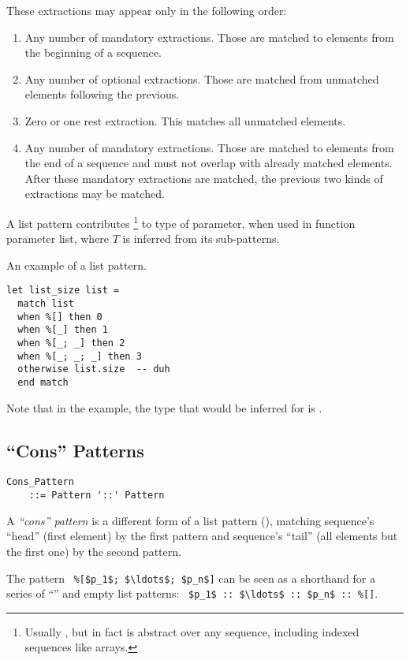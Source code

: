 These extractions may appear only in the following order:
\begin{enumerate}
  \item Any number of mandatory extractions. Those are matched to elements from the beginning of a sequence. 
  \item Any number of optional extractions. Those are matched from unmatched elements following the previous. 
  \item Zero or one rest extraction. This matches all unmatched elements. 
  \item Any number of mandatory extractions. Those are matched to elements from the end of a sequence and must not overlap with already matched elements. After these mandatory extractions are matched, the previous two kinds of extractions may be matched. 
\end{enumerate}

A list pattern contributes \footnote{Usually , but in fact is abstract over any sequence, including indexed sequences like arrays.} to type of parameter, when used in function parameter list, where $T$ is inferred from its sub-patterns. 

\example An example of a list pattern.
\begin{lstlisting}
let list_size list = 
  match list 
  when %[] then 0
  when %[_] then 1
  when %[_; _] then 2
  when %[_; _; _] then 3
  otherwise list.size  -- duh
  end match
\end{lstlisting}
Note that in the example, the type that would be inferred for  is . 





\subsection[“Cons” Patterns]{``Cons'' Patterns}
\label{sec:cons-patterns}

\grammar\begin{lstlisting}
Cons_Pattern 
    ::= Pattern '::' Pattern
\end{lstlisting}

A {\em ``cons'' pattern} is a different form of a list pattern (), matching sequence's ``head'' (first element) by the first pattern and sequence's ``tail'' (all elements but the first one) by the second pattern. 

The pattern ~\lstinline!%[$p_1$; $\ldots$; $p_n$]! can be seen as a shorthand for a series of ``\code{::}'' and empty list patterns: ~\lstinline!$p_1$ :: $\ldots$ :: $p_n$ :: %[]!. 

